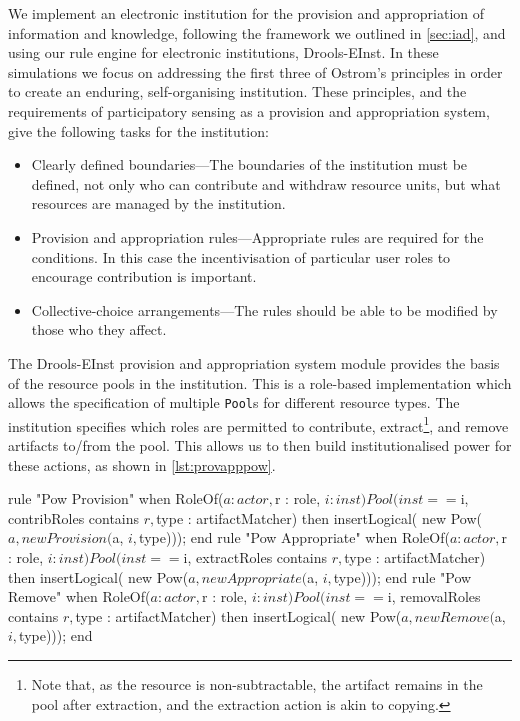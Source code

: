 We implement an electronic institution for the provision and appropriation of
information and knowledge, following the framework we outlined in
\autoref{sec:iad}, and using our rule engine for electronic institutions,
Drools-EInst. In these simulations we focus on addressing the first three of
Ostrom's principles in order to create an enduring, self-organising
institution. These principles, and the requirements of participatory sensing as a provision and appropriation system, give the following tasks for the institution:

\begin{itemize}
\item Clearly defined boundaries---The boundaries of the institution must be defined, not only who can contribute and withdraw resource units, but what resources are managed by the institution.
\item Provision and appropriation rules---Appropriate rules are required for the conditions. In this case the incentivisation of particular user roles to encourage contribution is important.
\item Collective-choice arrangements---The rules should be able to be modified by those who they affect.
\end{itemize}

The Drools-EInst provision and appropriation system module provides the basis
of the resource pools in the institution. This is a role-based implementation
which allows the specification of multiple \texttt{Pool}s for different
resource types. The institution specifies which roles are permitted to contribute,
extract\footnote{Note that, as the resource is non-subtractable, the artifact remains in the pool after extraction, and the extraction action is akin to copying.}, and remove artifacts to/from the pool. This allows us to then build
institutionalised power for these actions, as shown in \autoref{lst:provapppow}.

\begin{drools}[label=lst:provapppow,caption={[Institutionalised power for provision, appropration and removal from a pool of artifacts.]Institutionalised power for provision, appropration and removal from a pool of artifacts. The \texttt{artifactMatcher} specifies which type of object can be provisioned to the pool.}]
rule "Pow Provision"
	when
		RoleOf($a : actor, $r : role, $i : inst)
		Pool(inst == $i, contribRoles contains $r, $type : artifactMatcher)
	then
		insertLogical( new Pow($a, new Provision($a, $i, $type)));
end
rule "Pow Appropriate"
	when
		RoleOf($a : actor, $r : role, $i : inst)
		Pool(inst == $i, extractRoles contains $r, $type : artifactMatcher)
	then
		insertLogical( new Pow($a, new Appropriate($a, $i, $type)));
end
rule "Pow Remove"
	when
		RoleOf($a : actor, $r : role, $i : inst)
		Pool(inst == $i, removalRoles contains $r, $type : artifactMatcher)
	then
		insertLogical( new Pow($a, new Remove($a, $i, $type)));
end
\end{drools}

